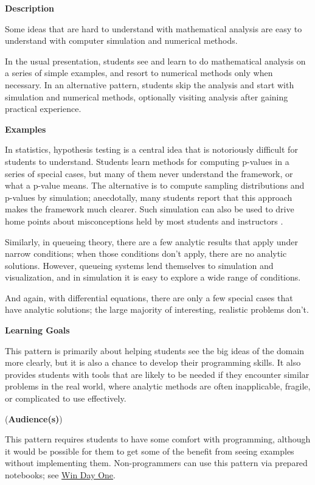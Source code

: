 \documentclass[]{book}
\begin{document}
\textbf{Description}

Some ideas that are hard to understand with mathematical analysis are
easy to understand with computer simulation and numerical methods.

In the usual presentation, students see and learn to do mathematical
analysis on a series of simple examples, and resort to numerical methods
only when necessary. In an alternative pattern, students skip the
analysis and start with simulation and numerical methods, optionally
visiting analysis after gaining practical experience.

\textbf{Examples}

In statistics, hypothesis testing is a central idea that is notoriously
difficult for students to understand. Students learn methods for
computing p-values in a series of special cases, but many of them never
understand the framework, or what a p-value means. The alternative is to
compute sampling distributions and p-values by simulation; anecdotally,
many students report that this approach makes the framework much
clearer. Such simulation can also be used to drive home points about
misconceptions held by most students and instructors
\citep{HallerKrauss2002}.

Similarly, in queueing theory, there are a few analytic results that
apply under narrow conditions; when those conditions don't apply, there
are no analytic solutions. However, queueing systems lend themselves to
simulation and visualization, and in simulation it is easy to explore a
wide range of conditions.

And again, with differential equations, there are only a few special
cases that have analytic solutions; the large majority of interesting,
realistic problems don't.

\textbf{Learning Goals}

This pattern is primarily about helping students see the big ideas of
the domain more clearly, but it is also a chance to develop their
programming skills. It also provides students with tools that are likely
to be needed if they encounter similar problems in the real world, where
analytic methods are often inapplicable, fragile, or complicated to use
effectively.

(\textbf{Audience(s)})

This pattern requires students to have some comfort with programming,
although it would be possible for them to get some of the benefit from
seeing examples without implementing them. Non-programmers can use this
pattern via prepared notebooks; see \protect\hyperlink{win-day-one}{Win
Day One}.
\end{document}
